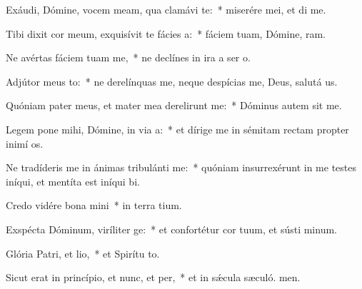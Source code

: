 \item Exáudi, Dómine, vocem meam, qua clamávi  te:~* miserére mei, et di me.
\item Tibi dixit cor meum, exquisívit te fácies a:~* fáciem tuam, Dómine, ram.
\item Ne avértas fáciem tuam  me,~* ne declínes in ira a ser o.
\item Adjútor meus to:~* ne derelínquas me, neque despícias me, Deus, salutá us.
\item Quóniam pater meus, et mater mea derelirunt me:~* Dóminus autem sit me.
\item Legem pone mihi, Dómine, in via a:~* et dírige me in sémitam rectam propter inimí os.
\item Ne tradíderis me in ánimas tribulánti me:~* quóniam insurrexérunt in me testes iníqui, et mentíta est iníqui bi.
\item Credo vidére bona mini~* in terra tium.
\item Exspécta Dóminum, viríliter ge:~* et confortétur cor tuum, et sústi minum.
\item Glória Patri, et lio,~* et Spirítu to.
\item Sicut erat in princípio, et nunc, et per,~* et in sǽcula sæculó. men.
